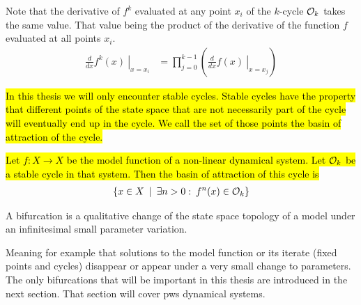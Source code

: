 Note that the derivative of $f^k$ evaluated at any point $x_i$ of the $k$-cycle $\mathcal{O}_k$ takes the same value.
That value being the product of the derivative of the function $f$ evaluated at all points $x_i$.
\begin{align}
	\left. \frac{d}{dx}f^k(x) \:\right|_{x = x_i} & = \prod_{j=0}^{k-1} \left( \left. \frac{d}{dx} f(x) \:\right|_{x = x_j} \right)
\end{align}

\hl{
	In this thesis we will only encounter stable cycles.
	Stable cycles have the property that different points of the state space that are not necessarily part of the cycle will eventually end up in the cycle.
	We call the set of those points the basin of attraction of the cycle.
}

\begin{definition}
	\hl{
		Let $f: X \to X$ be the model function of a non-linear dynamical system.
		Let $\mathcal{O}_k$ be a stable cycle in that system.
		Then the basin of attraction of this cycle is
	}
	\begin{align}
		\left\{x \in X \:\mid\: \exists n > 0: \:f^n(x) \in \mathcal{O}_k\right\}
	\end{align}
\end{definition}

\begin{definition}[Bifurcation]
	A bifurcation is a qualitative change of the state space topology of a model under an infinitesimal small parameter variation.
\end{definition}
Meaning for example that solutions to the model function or its iterate (fixed points and cycles) disappear or appear under a very small change to parameters.
The only bifurcations that will be important in this thesis are introduced in the next section.
That section will cover \gls{pws} dynamical systems.
